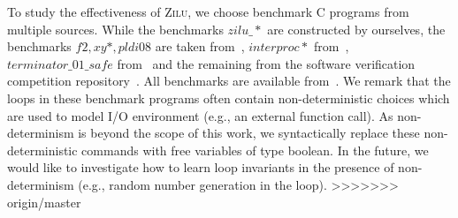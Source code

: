 To study the effectiveness of \textsc{Zilu}, we choose benchmark C programs from multiple sources.
While the benchmarks
 $zilu\_*$ are constructed by ourselves,
the benchmarks $f2, xy*, pldi08$ are taken from~\cite{gulwani2008program,sharma2012interpolants,gulavani2008automatically}, %
$interproc*$ from~\cite{jeannet2010interproc},
 $terminator\_01\_safe$ %
 from~\cite{beyer:SVCOMP:2013} and the remaining
from the software verification competition repository~\cite{Dirk:SVCOMP:2016}.  All benchmarks are available from~\cite{zilu:benchmark}.
We remark that the loops in these benchmark programs often contain non-deterministic choices
which are used to model I/O environment (e.g., an external function call).
As non-determinism is beyond the scope of this work, we syntactically replace these non-deterministic commands with free variables of type boolean. In the future, we would like to investigate how to learn loop invariants in the presence of non-determinism (e.g., random number generation in the loop).
>>>>>>> origin/master

